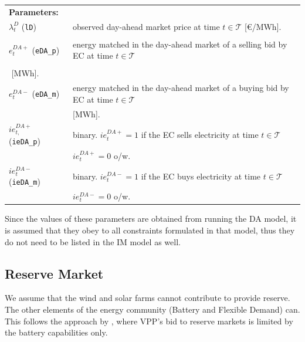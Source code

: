 \documentclass{article}
\begin{document}
\begin{tabularx}{\textwidth}{l l}

	\\
    \textbf{Parameters:} \\
	$\lambda^{D}_{t}$ (\verb|lD|) & observed  day-ahead market price at time $t \in \mathcal{T}$  [\euro/MWh]. \\
       \\
	$e^{DA+}_{t}$ (\verb|eDA_p|) & energy matched in the day-ahead market of a selling bid by EC at time $t \in \mathcal{T}$ \\
    \\
	$ $ [MWh]. \\
    
	$e^{DA-}_{t}$ (\verb|eDA_m|) & energy matched in the day-ahead market of a buying bid by EC at time $t \in \mathcal{T}$ \\
	& [MWh]. 
    \\
    $ie^{DA+}_{t,}$ (\verb|ieDA_p|) & binary. $ie^{DA+}_{t} = 1$ if the EC sells electricity at time $t \in \mathcal{T}$ \\
	& $ie^{DA+}_{t} = 0$ o/w. \\
	$ie^{DA-}_{t}$ (\verb|ieDA_m|) & binary. $ie^{DA-}_{t} = 1$ if the EC buys electricity at time $t \in \mathcal{T}$ \\
	& $ie^{DA-}_{t} = 0$ o/w.
\end{tabularx}

Since the values of these parameters are obtained from running the DA model, it is assumed that they obey to all constraints formulated in that model, thus they do not need to be listed in the IM model as well.

\subsection{Reserve Market}
We assume that the wind and solar farms cannot contribute to provide reserve. The other elements of the energy community (Battery and Flexible Demand) can. This follows the approach by \textcite{Heredia18}, where VPP's bid to reserve markets is limited by the battery capabilities only.

\end{document}
